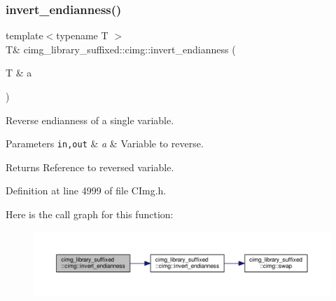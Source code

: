 \mbox{\label{namespacecimg__library__suffixed_1_1cimg_aaa2e6e8ccab85cc7fc7b9f02060965a2}} 
\subsubsection{\texorpdfstring{invert\+\_\+endianness()}{invert\_endianness()}\hspace{0.1cm}{\footnotesize\ttfamily [2/2]}}
{\footnotesize\ttfamily template$<$typename T $>$ \\
T\& cimg\+\_\+library\+\_\+suffixed\+::cimg\+::invert\+\_\+endianness (\begin{DoxyParamCaption}\item[{T \&}]{a }\end{DoxyParamCaption})\hspace{0.3cm}{\ttfamily [inline]}}



Reverse endianness of a single variable. 


\begin{DoxyParams}[1]{Parameters}
\mbox{\tt in,out}  & {\em a} & Variable to reverse. \\
\hline
\end{DoxyParams}
\begin{DoxyReturn}{Returns}
Reference to reversed variable. 
\end{DoxyReturn}


Definition at line 4999 of file C\+Img.\+h.

Here is the call graph for this function\+:
\nopagebreak
\begin{figure}[H]
\begin{center}
\leavevmode
\includegraphics[width=350pt]{d4/d9b/namespacecimg__library__suffixed_1_1cimg_aaa2e6e8ccab85cc7fc7b9f02060965a2_cgraph}
\end{center}
\end{figure}
\mbox{\label{namespacecimg__library__suffixed_1_1cimg_aca0e45a04eb1607f2e25101aae4b8572}} 
